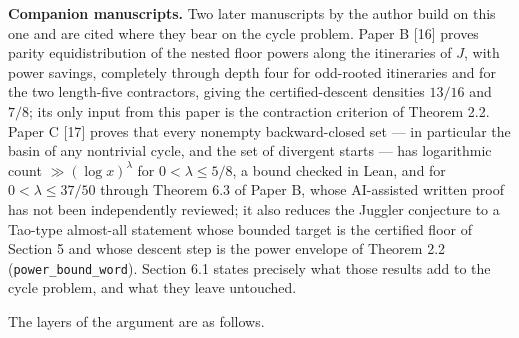 \documentclass[12pt]{article}
\begin{document}
\textbf{Companion manuscripts.} Two later manuscripts by the author
build on this one and are cited where they bear on the cycle problem.
Paper B {[}16{]} proves parity equidistribution of the nested floor
powers along the itineraries of \(J\), with power savings, completely
through depth four for odd-rooted itineraries and for the two
length-five contractors, giving the certified-descent densities
\(13/16\) and \(7/8\); its only input from this paper is the contraction
criterion of Theorem 2.2. Paper C {[}17{]} proves that every nonempty
backward-closed set --- in particular the basin of any nontrivial cycle,
and the set of divergent starts --- has logarithmic count
\(\gg(\log x)^{\lambda}\) for \(0<\lambda\le5/8\), a bound checked in
Lean, and for \(0<\lambda\le37/50\) through Theorem 6.3 of Paper B,
whose AI-assisted written proof has not been independently reviewed; it
also reduces the Juggler conjecture to a Tao-type almost-all statement
whose bounded target is the certified floor of Section 5 and whose
descent step is the power envelope of Theorem 2.2
(\texttt{\nolinkurl{power_bound_word}}). Section 6.1 states precisely
what those results add to the cycle problem, and what they leave
untouched.

The layers of the argument are as follows.
\end{document}
